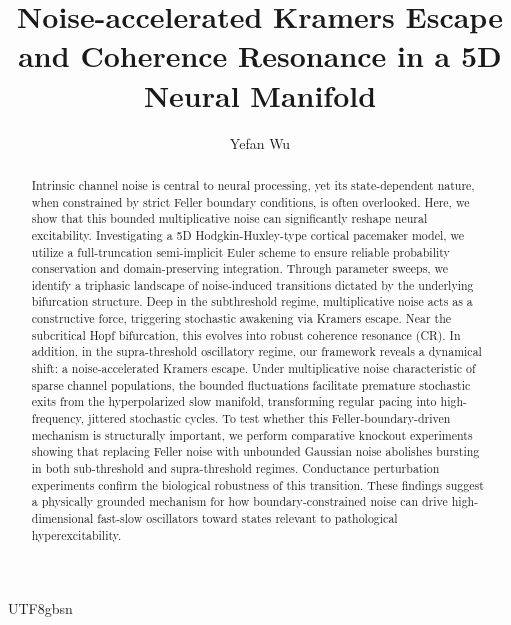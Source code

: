 ﻿\documentclass[reprint, amsmath, amssymb, aps, pre]{revtex4-2}
\begin{document}
\begin{CJK*}{UTF8}{gbsn}


\title{Noise-accelerated Kramers Escape and Coherence Resonance in a 5D Neural Manifold}

\author{Yefan Wu}


\begin{abstract}
Intrinsic channel noise is central to neural processing, yet its state-dependent nature, when constrained by strict Feller boundary conditions, is often overlooked. Here, we show that this bounded multiplicative noise can significantly reshape neural excitability. Investigating a 5D Hodgkin-Huxley-type cortical pacemaker model, we utilize a full-truncation semi-implicit Euler scheme to ensure reliable probability conservation and domain-preserving integration. Through parameter sweeps, we identify a triphasic landscape of noise-induced transitions dictated by the underlying bifurcation structure. Deep in the subthreshold regime, multiplicative noise acts as a constructive force, triggering stochastic awakening via Kramers escape. Near the subcritical Hopf bifurcation, this evolves into robust coherence resonance (CR). In addition, in the supra-threshold oscillatory regime, our framework reveals a dynamical shift: a noise-accelerated Kramers escape. Under multiplicative noise characteristic of sparse channel populations, the bounded fluctuations facilitate premature stochastic exits from the hyperpolarized slow manifold, transforming regular pacing into high-frequency, jittered stochastic cycles. To test whether this Feller-boundary-driven mechanism is structurally important, we perform comparative knockout experiments showing that replacing Feller noise with unbounded Gaussian noise abolishes bursting in both sub-threshold and supra-threshold regimes. Conductance perturbation experiments confirm the biological robustness of this transition. These findings suggest a physically grounded mechanism for how boundary-constrained noise can drive high-dimensional fast-slow oscillators toward states relevant to pathological hyperexcitability.
\end{abstract}

\maketitle



\end{CJK*}
\end{document}
